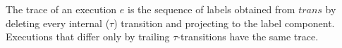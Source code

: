 \begin{definition}[Trace]
  \label{def:trace}
  \leanok
  The trace of an execution $e$ is the sequence of labels obtained from $trans$ by
  deleting every internal ($\tau$) transition and projecting to the label
  component. Executions that differ only by trailing $\tau$-transitions have the
  same trace.
\end{definition}
